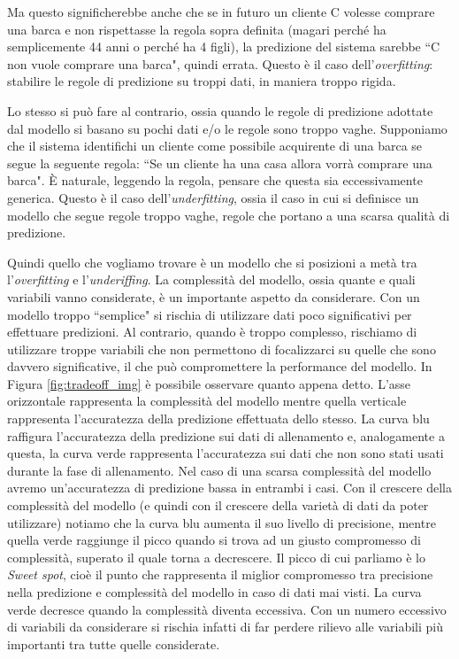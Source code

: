 \documentclass[12pt,italian]{report}
\begin{document}
Ma questo significherebbe anche che se in futuro un cliente C volesse comprare una barca e non rispettasse la regola sopra definita (magari perché ha semplicemente 44 anni o perché ha 4 figli), la predizione del sistema sarebbe ``C non vuole comprare una barca", quindi errata. Questo è il caso dell'\emph{overfitting}: stabilire le regole di predizione su troppi dati, in maniera troppo rigida.

Lo stesso si può fare al contrario, ossia quando le regole di predizione adottate dal modello si basano su pochi dati e/o le regole sono troppo vaghe. Supponiamo che il sistema identifichi un cliente come possibile acquirente di una barca se segue la seguente regola: ``Se un cliente ha una casa allora vorrà comprare una barca". È naturale, leggendo la regola, pensare che questa sia eccessivamente generica. Questo è il caso dell'\emph{underfitting}, ossia il caso in cui si definisce un modello che segue regole troppo vaghe, regole che portano a una scarsa qualità di predizione.

Quindi quello che vogliamo trovare è un modello che si posizioni a metà tra l'\emph{overfitting} e l'\emph{underiffing}. La complessità del modello, ossia quante e quali variabili vanno considerate, è un importante aspetto da considerare. Con un modello troppo ``semplice" si rischia di utilizzare dati poco significativi per effettuare predizioni. %
Al contrario, quando è troppo complesso, rischiamo di utilizzare troppe variabili che non permettono di focalizzarci su quelle che sono davvero significative, il che può compromettere la performance del modello. In Figura \ref{fig:tradeoff_img} è possibile osservare quanto appena detto. L'asse orizzontale rappresenta la complessità del modello mentre quella verticale rappresenta l'accuratezza della predizione effettuata dello stesso. La curva blu raffigura l'accuratezza della predizione sui dati di allenamento e, analogamente a questa, la curva verde rappresenta l'accuratezza sui dati che non sono stati usati durante la fase di allenamento. Nel caso di una scarsa complessità del modello avremo un'accuratezza di predizione bassa in entrambi i casi. Con il crescere della complessità del modello (e quindi con il crescere della varietà di dati da poter utilizzare) notiamo che la curva blu aumenta il suo livello di precisione, mentre quella verde raggiunge il picco quando si trova ad un giusto compromesso di complessità, superato il quale torna a decrescere. Il picco di cui parliamo è lo \emph{Sweet spot}, cioè il punto che rappresenta il miglior compromesso tra precisione nella predizione e complessità del modello in caso di dati mai visti. La curva verde decresce quando la complessità diventa eccessiva. Con un numero eccessivo di variabili da considerare si rischia infatti di far perdere rilievo alle variabili più importanti tra tutte quelle considerate.%
\end{document}
